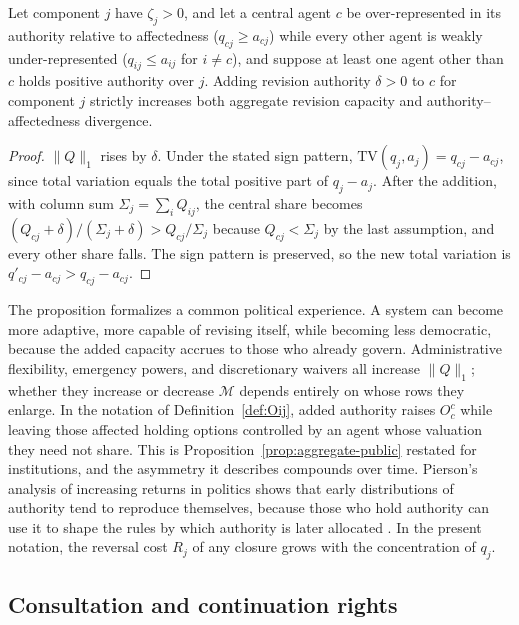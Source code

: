 \begin{proposition}\label{prop:revision-capacity}
Let component $j$ have $\zeta_j>0$, and let a central agent $c$ be over-represented in its authority relative to affectedness ($q_{cj}\geq a_{cj}$) while every other agent is weakly under-represented ($q_{ij}\leq a_{ij}$ for $i\neq c$), and suppose at least one agent other than $c$ holds positive authority over $j$. Adding revision authority $\delta>0$ to $c$ for component $j$ strictly increases both aggregate revision capacity and authority--affectedness divergence.
\end{proposition}

\begin{proof}
$\|Q\|_1$ rises by $\delta$. Under the stated sign pattern, $\mathrm{TV}(q_j,a_j)=q_{cj}-a_{cj}$, since total variation equals the total positive part of $q_j-a_j$. After the addition, with column sum $\Sigma_j=\sum_iQ_{ij}$, the central share becomes $(Q_{cj}+\delta)/(\Sigma_j+\delta)>Q_{cj}/\Sigma_j$ because $Q_{cj}<\Sigma_j$ by the last assumption, and every other share falls. The sign pattern is preserved, so the new total variation is $q'_{cj}-a_{cj}>q_{cj}-a_{cj}$.
\end{proof}

The proposition formalizes a common political experience. A system can become more adaptive, more capable of revising itself, while becoming less democratic, because the added capacity accrues to those who already govern. Administrative flexibility, emergency powers, and discretionary waivers all increase $\|Q\|_1$; whether they increase or decrease $\mathcal{M}$ depends entirely on whose rows they enlarge. In the notation of Definition~\ref{def:Oij}, added authority raises $O_c^c$ while leaving those affected holding options controlled by an agent whose valuation they need not share. This is Proposition~\ref{prop:aggregate-public} restated for institutions, and the asymmetry it describes compounds over time. Pierson's analysis of increasing returns in politics shows that early distributions of authority tend to reproduce themselves, because those who hold authority can use it to shape the rules by which authority is later allocated \cite{pierson2000}. In the present notation, the reversal cost $R_j$ of any closure grows with the concentration of $q_j$.

\subsection{Consultation and continuation rights}

